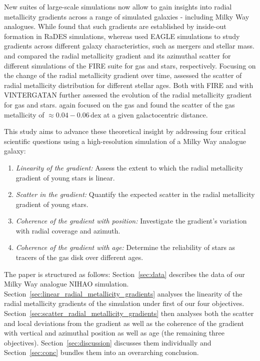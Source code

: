 \documentclass[fleqn,usenatbib]{mnras}
\begin{document}
New suites of large-scale simulations now allow to gain insights into radial metallicity gradients across a range of simulated galaxies - including Milky Way analogues. While \citet{Pilkington2012} found that such gradients are established by inside-out formation in RaDES simulations, whereas \citet{Tissera2019} used EAGLE simulations to study gradients across different galaxy characteristics, such as mergers and stellar mass. \citet{Bellardini2021} and \citet{Bellardini2022, Graf2024} compared the radial metallicity gradient and its azimuthal scatter for different simulations of the FIRE suite for gas and stars, respectively. Focusing on the change of the radial metallicity gradient over time, \citet{Grand2015} assessed the scatter of radial metallicity distribution for different stellar ages. Both \citet[][see their Fig. 6]{Ma2017} with FIRE and \citet[see their Fig. 9][]{Agertz2021} with VINTERGATAN further assessed the evolution of the radial metallicity gradient for gas and stars. \citet{Khoperskov2023e} again focused on the gas and found the scatter of the gas metallicity of $\approx 0.04-0.06\,\mathrm{dex}$ at a given galactocentric distance.

This study aims to advance these theoretical insight by addressing four critical scientific questions using a high-resolution simulation of a Milky Way analogue galaxy:
\begin{enumerate}
\item \textit{Linearity of the gradient:} Assess the extent to which the radial metallicity gradient of young stars is linear.
\item \textit{Scatter in the gradient:} Quantify the expected scatter in the radial metallicity gradient of young stars.
\item \textit{Coherence of the gradient with position:} Investigate the gradient's variation with radial coverage and azimuth.
\item \textit{Coherence of the gradient with age:} Determine the reliability of stars as tracers of the gas disk over different ages.
\end{enumerate}

The paper is structured as follows: Section~\ref{sec:data} describes the data of our Milky Way analogue NIHAO simulation. Section~\ref{sec:linear_radial_metallicity_gradients} analyses the linearity of the radial metallicity gradients of the simulation under first of our four objectives. Section~\ref{sec:scatter_radial_metallicity_gradients} then analyses both the scatter and local deviations from the gradient as well as the coherence of the gradient with vertical and azimuthal position as well as age (the remaining three objectives). Section~\ref{sec:discussion} discusses them individually and Section~\ref{sec:conc} bundles them into an overarching conclusion.
\end{document}
